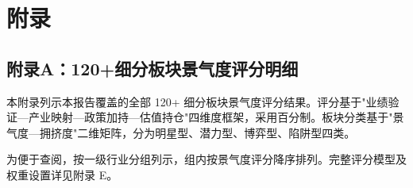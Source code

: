 
\chapter{附录}

\section{附录A：120+细分板块景气度评分明细}

本附录列示本报告覆盖的全部 120+ 细分板块景气度评分结果。评分基于"业绩验证---产业映射---政策加持---估值持仓"四维度框架，采用百分制。板块分类基于"景气度---拥挤度"二维矩阵，分为明星型、潜力型、博弈型、陷阱型四类。

\vspace{0.3em}

为便于查阅，按一级行业分组列示，组内按景气度评分降序排列。完整评分模型及权重设置详见附录 E。


